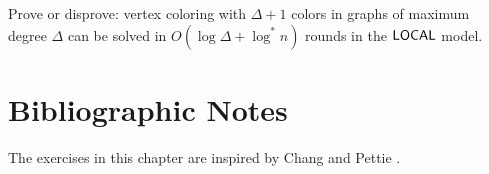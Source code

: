 \begin{exss}
  Prove or disprove: vertex coloring with $\Delta+1$ colors in graphs of maximum degree $\Delta$ can be solved in $O(\log \Delta + \log^* n)$ rounds in the $\textup{\sffamily LOCAL}$ model.
\end{exss}

\section{Bibliographic Notes}

The exercises in this chapter are inspired by Chang and Pettie \cite{Chang2019}.

